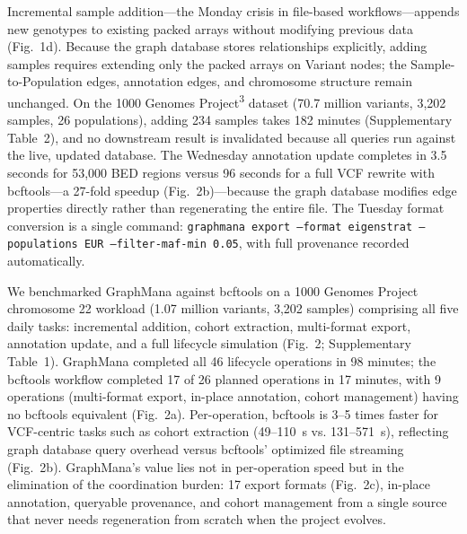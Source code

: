 \documentclass[11pt,a4paper]{article}
\newcommand{\citenum}[1]{\textsuperscript{#1}}
\newcommand{\code}[1]{\texttt{\small #1}}
\begin{document}
Incremental sample addition---the Monday crisis in file-based workflows---appends new genotypes to existing packed arrays without modifying previous data (Fig.~1d). Because the graph database stores relationships explicitly, adding samples requires extending only the packed arrays on Variant nodes; the Sample-to-Population edges, annotation edges, and chromosome structure remain unchanged. On the 1000 Genomes Project\citenum{3} dataset (70.7 million variants, 3,202 samples, 26 populations), adding 234 samples takes 182 minutes (Supplementary Table~2), and no downstream result is invalidated because all queries run against the live, updated database. The Wednesday annotation update completes in 3.5 seconds for 53,000 BED regions versus 96 seconds for a full VCF rewrite with bcftools---a 27-fold speedup (Fig.~2b)---because the graph database modifies edge properties directly rather than regenerating the entire file. The Tuesday format conversion is a single command: \code{graphmana export --format eigenstrat --populations EUR --filter-maf-min 0.05}, with full provenance recorded automatically.

We benchmarked GraphMana against bcftools on a 1000 Genomes Project chromosome 22 workload (1.07 million variants, 3,202 samples) comprising all five daily tasks: incremental addition, cohort extraction, multi-format export, annotation update, and a full lifecycle simulation (Fig.~2; Supplementary Table~1). GraphMana completed all 46 lifecycle operations in 98 minutes; the bcftools workflow completed 17 of 26 planned operations in 17 minutes, with 9 operations (multi-format export, in-place annotation, cohort management) having no bcftools equivalent (Fig.~2a). Per-operation, bcftools is 3--5 times faster for VCF-centric tasks such as cohort extraction (49--110~s vs. 131--571~s), reflecting graph database query overhead versus bcftools' optimized file streaming (Fig.~2b). GraphMana's value lies not in per-operation speed but in the elimination of the coordination burden: 17 export formats (Fig.~2c), in-place annotation, queryable provenance, and cohort management from a single source that never needs regeneration from scratch when the project evolves.
\end{document}

